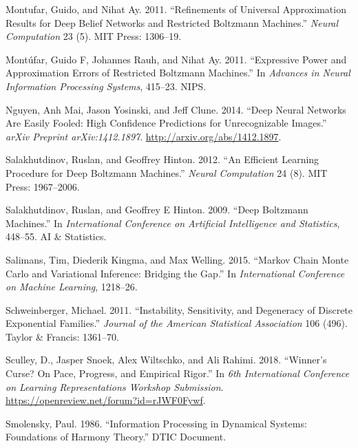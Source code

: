 \documentclass[AMS,STIX1COL]{WileyNJD-v2}
\begin{document}
\leavevmode\hypertarget{ref-montufar2011refinements}{}%
Montufar, Guido, and Nihat Ay. 2011. ``Refinements of Universal
Approximation Results for Deep Belief Networks and Restricted Boltzmann
Machines.'' \emph{Neural Computation} 23 (5). MIT Press: 1306--19.

\leavevmode\hypertarget{ref-montufar2011expressive}{}%
Montúfar, Guido F, Johannes Rauh, and Nihat Ay. 2011. ``Expressive Power
and Approximation Errors of Restricted Boltzmann Machines.'' In
\emph{Advances in Neural Information Processing Systems}, 415--23. NIPS.

\leavevmode\hypertarget{ref-nguyen2014deep}{}%
Nguyen, Anh Mai, Jason Yosinski, and Jeff Clune. 2014. ``Deep Neural
Networks Are Easily Fooled: High Confidence Predictions for
Unrecognizable Images.'' \emph{arXiv Preprint arXiv:1412.1897}.
\url{http://arxiv.org/abs/1412.1897}.

\leavevmode\hypertarget{ref-salakhutdinov2012efficient}{}%
Salakhutdinov, Ruslan, and Geoffrey Hinton. 2012. ``An Efficient
Learning Procedure for Deep Boltzmann Machines.'' \emph{Neural
Computation} 24 (8). MIT Press: 1967--2006.

\leavevmode\hypertarget{ref-salakhutdinov2009deep}{}%
Salakhutdinov, Ruslan, and Geoffrey E Hinton. 2009. ``Deep Boltzmann
Machines.'' In \emph{International Conference on Artificial Intelligence
and Statistics}, 448--55. AI \& Statistics.

\leavevmode\hypertarget{ref-salimans2015markov}{}%
Salimans, Tim, Diederik Kingma, and Max Welling. 2015. ``Markov Chain
Monte Carlo and Variational Inference: Bridging the Gap.'' In
\emph{International Conference on Machine Learning}, 1218--26.

\leavevmode\hypertarget{ref-schweinberger2011instability}{}%
Schweinberger, Michael. 2011. ``Instability, Sensitivity, and Degeneracy
of Discrete Exponential Families.'' \emph{Journal of the American
Statistical Association} 106 (496). Taylor \& Francis: 1361--70.

\leavevmode\hypertarget{ref-sculley2018winner}{}%
Sculley, D., Jasper Snoek, Alex Wiltschko, and Ali Rahimi. 2018.
``Winner's Curse? On Pace, Progress, and Empirical Rigor.'' In \emph{6th
International Conference on Learning Representations Workshop
Submission}. \url{https://openreview.net/forum?id=rJWF0Fywf}.

\leavevmode\hypertarget{ref-smolensky1986information}{}%
Smolensky, Paul. 1986. ``Information Processing in Dynamical Systems:
Foundations of Harmony Theory.'' DTIC Document.
\end{document}
